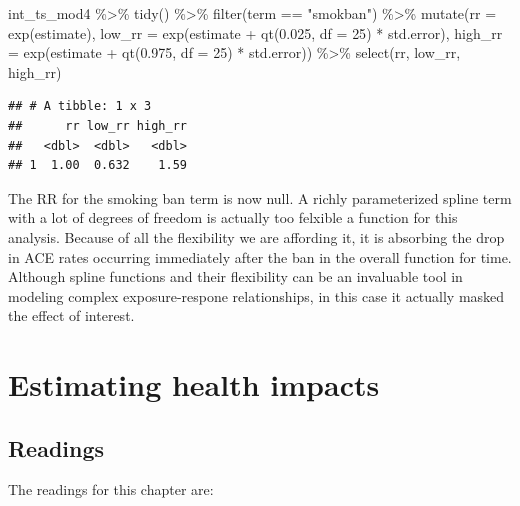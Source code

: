 \documentclass[
]{book}
\newenvironment{Shaded}{\begin{snugshade}}{\end{snugshade}}
\newcommand{\AttributeTok}[1]{\textcolor[rgb]{0.77,0.63,0.00}{#1}}
\newcommand{\DecValTok}[1]{\textcolor[rgb]{0.00,0.00,0.81}{#1}}
\newcommand{\FloatTok}[1]{\textcolor[rgb]{0.00,0.00,0.81}{#1}}
\newcommand{\FunctionTok}[1]{\textcolor[rgb]{0.00,0.00,0.00}{#1}}
\newcommand{\NormalTok}[1]{#1}
\newcommand{\SpecialCharTok}[1]{\textcolor[rgb]{0.00,0.00,0.00}{#1}}
\newcommand{\StringTok}[1]{\textcolor[rgb]{0.31,0.60,0.02}{#1}}
\begin{document}
\begin{Shaded}
\begin{Highlighting}[]
\NormalTok{int\_ts\_mod4 }\SpecialCharTok{\%\textgreater{}\%} 
  \FunctionTok{tidy}\NormalTok{() }\SpecialCharTok{\%\textgreater{}\%} 
  \FunctionTok{filter}\NormalTok{(term }\SpecialCharTok{==} \StringTok{"smokban"}\NormalTok{) }\SpecialCharTok{\%\textgreater{}\%} 
  \FunctionTok{mutate}\NormalTok{(}\AttributeTok{rr =} \FunctionTok{exp}\NormalTok{(estimate), }
         \AttributeTok{low\_rr =} \FunctionTok{exp}\NormalTok{(estimate }\SpecialCharTok{+} \FunctionTok{qt}\NormalTok{(}\FloatTok{0.025}\NormalTok{, }\AttributeTok{df =} \DecValTok{25}\NormalTok{) }\SpecialCharTok{*}\NormalTok{ std.error), }
         \AttributeTok{high\_rr =} \FunctionTok{exp}\NormalTok{(estimate }\SpecialCharTok{+} \FunctionTok{qt}\NormalTok{(}\FloatTok{0.975}\NormalTok{, }\AttributeTok{df =} \DecValTok{25}\NormalTok{) }\SpecialCharTok{*}\NormalTok{ std.error)) }\SpecialCharTok{\%\textgreater{}\%} 
  \FunctionTok{select}\NormalTok{(rr, low\_rr, high\_rr)}
\end{Highlighting}
\end{Shaded}

\begin{verbatim}
## # A tibble: 1 x 3
##      rr low_rr high_rr
##   <dbl>  <dbl>   <dbl>
## 1  1.00  0.632    1.59
\end{verbatim}

The RR for the smoking ban term is now null. A richly parameterized spline term with a lot of degrees of freedom is actually too felxible a function for this analysis. Because of all the flexibility we are affording it, it is absorbing the drop in ACE rates occurring immediately after the ban in the overall function for time. Although spline functions and their flexibility can be an invaluable tool in modeling complex exposure-respone relationships, in this case it actually masked the effect of interest.

\hypertarget{estimating-health-impacts}{%
\chapter{Estimating health impacts}\label{estimating-health-impacts}}

\hypertarget{readings-3}{%
\section{Readings}\label{readings-3}}

The readings for this chapter are:
\end{document}
